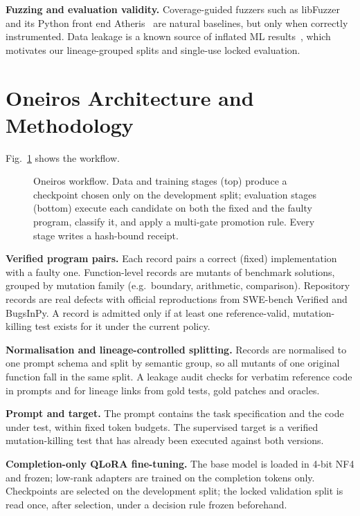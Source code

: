 \documentclass[conference,a4paper]{IEEEtran}
\begin{document}
\textbf{Fuzzing and evaluation validity.} Coverage-guided fuzzers such as
libFuzzer~\cite{serebryany2016libfuzzer} and its Python front end
Atheris~\cite{atheris} are natural baselines, but only when correctly instrumented.
Data leakage is a known source of inflated ML results~\cite{kapoor2023leakage}, which
motivates our lineage-grouped splits and single-use locked evaluation.

\section{Oneiros Architecture and Methodology}

Fig.~\ref{fig:workflow} shows the workflow.

\begin{figure}[t]
\centering

\caption{Oneiros workflow. Data and training stages (top) produce a checkpoint chosen
only on the development split; evaluation stages (bottom) execute each candidate on
both the fixed and the faulty program, classify it, and apply a multi-gate promotion
rule. Every stage writes a hash-bound receipt.}
\label{fig:workflow}
\end{figure}

\textbf{Verified program pairs.} Each record pairs a correct (fixed) implementation
with a faulty one. Function-level records are mutants of benchmark solutions, grouped
by mutation family (e.g.\ boundary, arithmetic, comparison). Repository records are
real defects with official reproductions from SWE-bench Verified and BugsInPy. A record
is admitted only if at least one reference-valid, mutation-killing test exists for it
under the current policy.

\textbf{Normalisation and lineage-controlled splitting.} Records are normalised to one
prompt schema and split by semantic group, so all mutants of one original function
fall in the same split. A leakage audit checks for verbatim reference code in prompts
and for lineage links from gold tests, gold patches and oracles.

\textbf{Prompt and target.} The prompt contains the task specification and the code
under test, within fixed token budgets. The supervised target is a verified
mutation-killing test that has already been executed against both versions.

\textbf{Completion-only QLoRA fine-tuning.} The base model is loaded in 4-bit NF4 and
frozen; low-rank adapters are trained on the completion tokens only. Checkpoints are
selected on the development split; the locked validation split is read once, after
selection, under a decision rule frozen beforehand.
\end{document}
